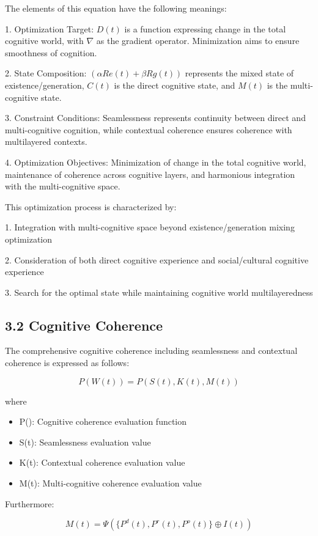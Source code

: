 \documentclass{article}
\begin{document}
The elements of this equation have the following meanings:

1. Optimization Target: $D(t)$ is a function expressing change in the total cognitive world, with $\nabla$ as the gradient operator. Minimization aims to ensure smoothness of cognition.

2. State Composition: $(\alpha Re(t) + \beta Rg(t))$ represents the mixed state of existence/generation, $C(t)$ is the direct cognitive state, and $M(t)$ is the multi-cognitive state.

3. Constraint Conditions: Seamlessness represents continuity between direct and multi-cognitive cognition, while contextual coherence ensures coherence with multilayered contexts.

4. Optimization Objectives: Minimization of change in the total cognitive world, maintenance of coherence across cognitive layers, and harmonious integration with the multi-cognitive space.

This optimization process is characterized by:

1. Integration with multi-cognitive space beyond existence/generation mixing optimization

2. Consideration of both direct cognitive experience and social/cultural cognitive experience

3. Search for the optimal state while maintaining cognitive world multilayeredness

\subsection{3.2 Cognitive Coherence}

The comprehensive cognitive coherence including seamlessness and contextual coherence is expressed as follows:

$$
P(W(t)) = P(S(t), K(t), M(t))
$$

where
\begin{itemize}
    \item P(): Cognitive coherence evaluation function
    \item S(t): Seamlessness evaluation value
    \item K(t): Contextual coherence evaluation value
    \item M(t): Multi-cognitive coherence evaluation value
\end{itemize}

Furthermore:

$$
M(t) = \Psi(\{P^d(t), P^r(t), P^o(t)\} \oplus I(t))
$$
\end{document}
